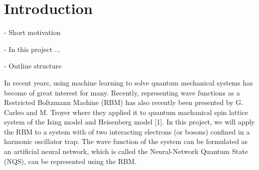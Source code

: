 \section{Introduction}\label{sec:Introduction}

- Short motivation

- In this project ... 

- Outline structure


In recent years, using machine learning to solve quantum mechanical systems has become of great interest for many. Recently, representing wave functions as a Restricted Boltzmann Machine (RBM) has also recently been presented by G. Carleo and M. Troyer where they applied it to quantum machanical spin lattice system of the Ising model and Heisenberg model [1]. In this project, we will apply the RBM to a system with of two interacting electrons (or bosons) confined in a harmonic oscillator trap. The wave function of the system can be formulated as an artificial neural network, which is called the Neural-Network Quantum State (NQS), can be represented using the RBM. 

\iffalse
We will test our implementation against a Variational Monte Carlo method with optimization algorithms such as ADAM (which will also be used to find an upper limit for the ground state?)

As quantum mechanical systems become more complex, it becomes exponentially harder to solve the problem numerically, and only the simplest of models have an analytical solution. 

1. G. Carleo and M. Troyer, Science 355, Issue 6325, pp. 602-606 (2017)
\fi